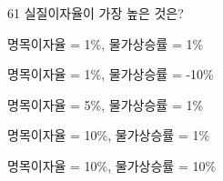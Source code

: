 \begin{question}{61}
실질이자율이 가장 높은 것은?
\begin{choices}
  \item 명목이자율 = 1\%, 물가상승률 = 1\%
  \item 명목이자율 = 1\%, 물가상승률 = -10\%
  \item 명목이자율 = 5\%, 물가상승률 = 1\%
  \item 명목이자율 = 10\%, 물가상승률 = 1\%
  \item 명목이자율 = 10\%, 물가상승률 = 10\%
\end{choices}
\end{question}
